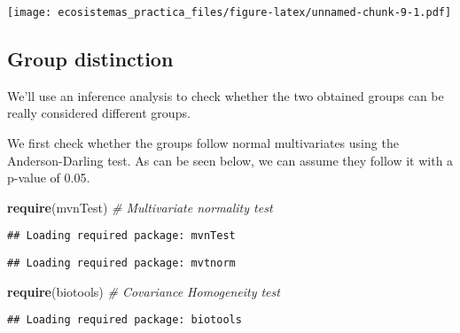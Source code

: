 \documentclass[]{article}
\newenvironment{Shaded}{\begin{snugshade}}{\end{snugshade}}
\newcommand{\KeywordTok}[1]{\textcolor[rgb]{0.13,0.29,0.53}{\textbf{#1}}}
\newcommand{\DataTypeTok}[1]{\textcolor[rgb]{0.13,0.29,0.53}{#1}}
\newcommand{\DecValTok}[1]{\textcolor[rgb]{0.00,0.00,0.81}{#1}}
\newcommand{\StringTok}[1]{\textcolor[rgb]{0.31,0.60,0.02}{#1}}
\newcommand{\CommentTok}[1]{\textcolor[rgb]{0.56,0.35,0.01}{\textit{#1}}}
\newcommand{\OtherTok}[1]{\textcolor[rgb]{0.56,0.35,0.01}{#1}}
\newcommand{\OperatorTok}[1]{\textcolor[rgb]{0.81,0.36,0.00}{\textbf{#1}}}
\newcommand{\NormalTok}[1]{#1}
\begin{document}
\begin{Shaded}
\end{Shaded}

\texttt{[image: ecosistemas\_practica\_files/figure-latex/unnamed-chunk-9-1.pdf]}

\subsection{Group distinction}\label{group-distinction}

We'll use an inference analysis to check whether the two obtained groups
can be really considered different groups.

We first check whether the groups follow normal multivariates using the
Anderson-Darling test. As can be seen below, we can assume they follow
it with a p-value of 0.05.

\begin{Shaded}
\begin{Highlighting}[]
\KeywordTok{require}\NormalTok{(mvnTest) }\CommentTok{# Multivariate normality test}
\end{Highlighting}
\end{Shaded}

\begin{verbatim}
## Loading required package: mvnTest
\end{verbatim}

\begin{verbatim}
## Loading required package: mvtnorm
\end{verbatim}

\begin{Shaded}
\begin{Highlighting}[]
\KeywordTok{require}\NormalTok{(biotools) }\CommentTok{# Covariance Homogeneity test}
\end{Highlighting}
\end{Shaded}

\begin{verbatim}
## Loading required package: biotools
\end{verbatim}
\end{document}
